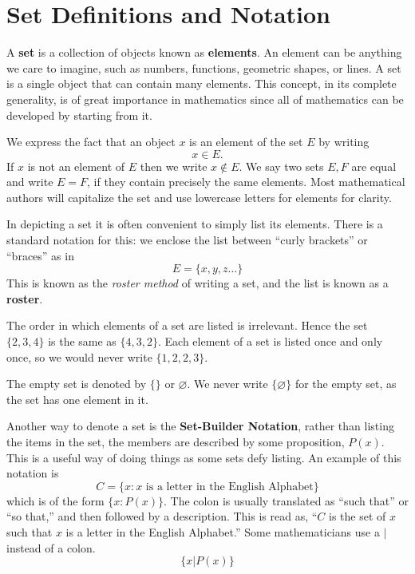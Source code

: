 \section{Set Definitions and Notation}

A \textbf{set} is a collection of objects known as \textbf{elements}. An element can be
anything we care to imagine, such as numbers, functions, geometric shapes, or lines. A set is a single
object that can contain many elements. This concept, in its  complete generality, is of great importance in mathematics since all of mathematics can be developed by starting from it. 


We express the fact that an object $x$ is an element of the set $E$ by writing 
\[x \in E. \] 
If $x$ is not an element of $E$ then we write $x \not\in E$. We say two sets $E,F$ are equal and write $E=F$, if they contain precisely the same elements. Most mathematical authors will capitalize the set and use lowercase letters for elements for clarity.

In depicting a set it is often convenient to simply list its elements. There is a standard notation for this: we enclose the list between \enquote{curly brackets} or \enquote{braces} as in
\[ E = \{x,y,z\dots\} \]
This is known as the \emph{roster method} of writing a set, and the list is known as a \textbf{roster}. 

The order in which elements of a set are listed is irrelevant. Hence the set $\{2,3,4\}$ is the same as $\{4,3,2\}$. Each element of a set is listed once and only once, so we would never write $\{1,2,2,3\}$.

The empty set is denoted by $\{\}$ or $\varnothing$.  We never write $\{\varnothing\}$ for the empty set, as the set has one element in it.

Another way to denote a set is the \textbf{Set-Builder Notation}, rather than
listing the items in the set, the members are described by some proposition, $P(x)$.
This is a useful way of doing things as some sets defy listing. An example of this
notation is
\[ C = \{x : x \text{ is a letter in the English Alphabet}\}\]
which is of the form $\{x:P(x)\}$. The colon is usually translated as \enquote{such that} or
\enquote{so that,} and then followed by a description. This is read as, ``$C$ is the set of $x$ such
that $x$ is a letter in the English Alphabet.'' Some mathematicians use a $\vert$ instead of a colon.
\[ \{x \vert P(x)\}\]

\makeatletter
\newif\if@suchthatsymbol
\@suchthatsymbolfalse
\def\suchthat{%
  \if@suchthatsymbol
    \expandafter\vert
  \else
    \expandafter\text{ such that }  
  \fi  
}
\makeatother

